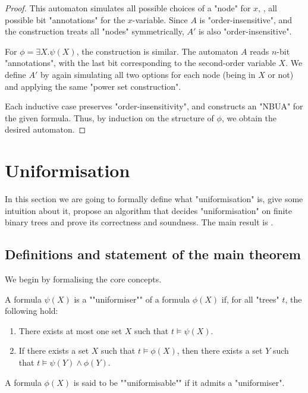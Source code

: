 \documentclass[a4paper,UKenglish,cleveref, autoref, thm-restate]{lipics-v2021}
\begin{document}
\begin{proof}
	This automaton simulates all possible choices of a "node" for $x$, \ie, all possible  bit "annotations" for the $x$-variable.
	Since $A$ is "order-insensitive", and the construction treats all "nodes" symmetrically, $A'$ is also "order-insensitive".

	For $\phi = \exists X.\psi(X)$, the construction is similar. The automaton $A$ reads $n$-bit "annotations", with the last bit corresponding
	to the second-order variable $X$. We define $A'$ by again simulating all two options for each node (being in $X$ or not) and applying the same
	"power set construction".

	Each inductive case preserves "order-insensitivity", and constructs an "NBUA" for the given formula. Thus, by induction on the structure of $\phi$,
	we obtain the desired automaton.
\end{proof}


\section{Uniformisation}\label{sec:uniformisation}

In this section we are going to formally define what "uniformisation" is, give some intuition about it,
propose an algorithm that decides "uniformisation" on finite binary trees and prove its correctness and soundness.
The main result is .

\subsection{Definitions and statement of the main theorem}

We begin by formalising the core concepts.

\begin{definition}\label{def:uniformiser}
	\AP A formula $\psi(X)$ is a ""uniformiser"" of a formula $\phi(X)$ if, for all "trees" $t$, the following hold:
	\begin{enumerate}
		\item There exists at most one set $X$ such that $t \models \psi(X)$.
		\item If there exists a set $X$ such that $t \models \phi(X)$, then there exists a set $Y$ such that $t \models \psi(Y) \land \phi(Y)$.
	\end{enumerate}
	\AP A formula $\phi(X)$ is said to be ""uniformisable"" if it admits a "uniformiser".
\end{definition}
\end{document}
